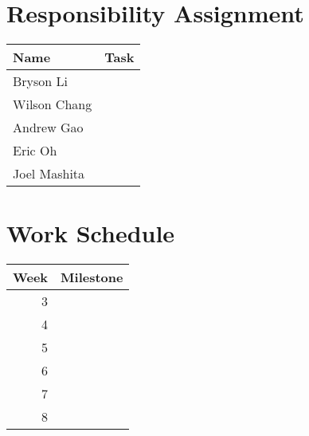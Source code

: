 \documentclass[11pt]{article}
\begin{document}
\section{Responsibility Assignment}
\label{sec:orga2bebe6}
\begin{center}
\begin{tabular}{ll}
Name & Task\\
\hline
Bryson Li & \\
Wilson Chang & \\
Andrew Gao & \\
Eric Oh & \\
Joel Mashita & \\
\end{tabular}
\end{center}
\section{Work Schedule}
\label{sec:org49dab72}
\begin{center}
\begin{tabular}{rl}
Week & Milestone\\
\hline
3 & \\
4 & \\
5 & \\
6 & \\
7 & \\
8 & \\
\end{tabular}
\end{center}
\end{document}
